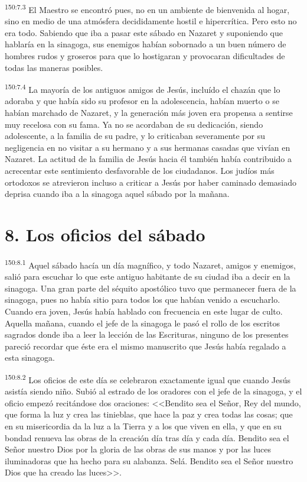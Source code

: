 \par 
\textsuperscript{150:7.3} El Maestro se encontró pues, no en un ambiente de bienvenida al hogar, sino en medio de una atmósfera decididamente hostil e hipercrítica. Pero esto no era todo. Sabiendo que iba a pasar este sábado en Nazaret y suponiendo que hablaría en la sinagoga, sus enemigos habían sobornado a un buen número de hombres rudos y groseros para que lo hostigaran y provocaran dificultades de todas las maneras posibles.

\par 
\textsuperscript{150:7.4} La mayoría de los antiguos amigos de Jesús, incluído el chazán que lo adoraba y que había sido su profesor en la adolescencia, habían muerto o se habían marchado de Nazaret, y la generación más joven era propensa a sentirse muy recelosa con su fama. Ya no se acordaban de su dedicación, siendo adolescente, a la familia de su padre, y lo criticaban severamente por su negligencia en no visitar a su hermano y a sus hermanas casadas que vivían en Nazaret. La actitud de la familia de Jesús hacia él también había contribuido a acrecentar este sentimiento desfavorable de los ciudadanos. Los judíos más ortodoxos se atrevieron incluso a criticar a Jesús por haber caminado demasiado deprisa cuando iba a la sinagoga aquel sábado por la mañana.

\section*{8. Los oficios del sábado}
\par 
\textsuperscript{150:8.1} Aquel sábado hacía un día magnífico, y todo Nazaret, amigos y enemigos, salió para escuchar lo que este antiguo habitante de su ciudad iba a decir en la sinagoga. Una gran parte del séquito apostólico tuvo que permanecer fuera de la sinagoga, pues no había sitio para todos los que habían venido a escucharlo. Cuando era joven, Jesús había hablado con frecuencia en este lugar de culto. Aquella mañana, cuando el jefe de la sinagoga le pasó el rollo de los escritos sagrados donde iba a leer la lección de las Escrituras, ninguno de los presentes pareció recordar que éste era el mismo manuscrito que Jesús había regalado a esta sinagoga.

\par 
\textsuperscript{150:8.2} Los oficios de este día se celebraron exactamente igual que cuando Jesús asistía siendo niño. Subió al estrado de los oradores con el jefe de la sinagoga, y el oficio empezó recitándose dos oraciones: <<Bendito sea el Señor, Rey del mundo, que forma la luz y crea las tinieblas, que hace la paz y crea todas las cosas; que en su misericordia da la luz a la Tierra y a los que viven en ella, y que en su bondad renueva las obras de la creación día tras día y cada día. Bendito sea el Señor nuestro Dios por la gloria de las obras de sus manos y por las luces iluminadoras que ha hecho para su alabanza. Selá. Bendito sea el Señor nuestro Dios que ha creado las luces>>.

